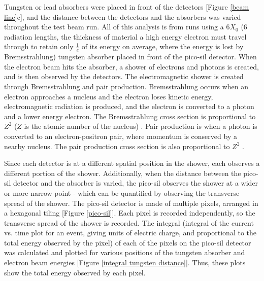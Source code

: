 \documentclass[twocolumn,aps,prd,reprint]{revtex4-1}
\begin{document}
Tungsten or lead absorbers were placed in front of the detectors [Figure \ref{beam line}c], and the distance between the detectors and the absorbers was varied throughout the test beam run. All of this analysis is from runs using a 6$X_0$ (6 radiation lengths, the thickness of material a high energy electron must travel through to retain only $\frac{1}{e}$ of its energy on average, where the energy is lost by Bremsstrahlung) tungsten absorber placed in front of the pico-sil detector. When the electron beam hits the absorber, a shower of electrons and photons is created, and is then observed by the detectors.  The electromagnetic shower is created through Bremsstrahlung and pair production. Bremsstrahlung occurs when an electron approaches a nucleus and the electron loses kinetic energy, electromagnetic radiation is produced, and the electron is converted to a photon and a lower energy electron. The Bremsstrahlung cross section is proportional to $Z^2$ ($Z$ is the atomic number of the nucleus) \cite{Leo}. Pair production is when a photon is converted to an electron-positron pair, where momentum is conserved by a nearby nucleus. The pair production cross section is also proportional to $Z^2$ \cite{Leo}.

Since each detector is at a different spatial position in the shower, each observes a different portion of the shower. Additionally, when the distance between the pico-sil detector and the absorber is varied, the pico-sil observes the shower at a wider or more narrow point - which can be quantified by observing the transverse spread of the shower. The pico-sil detector is made of multiple pixels, arranged in a hexagonal tiling [Figure \ref{pico-sil}]. Each pixel is recorded independently, so the transverse spread of the shower is recorded. The integral (integral of the current vs. time plot for an event, giving units of electric charge, and proportional to the total energy observed by the pixel) of each of the pixels on the pico-sil detector was calculated and plotted for various positions of the tungsten absorber and electron beam energies [Figure \ref{integral tungsten distance}]. Thus, these plots show the total energy observed by each pixel.
\end{document}
